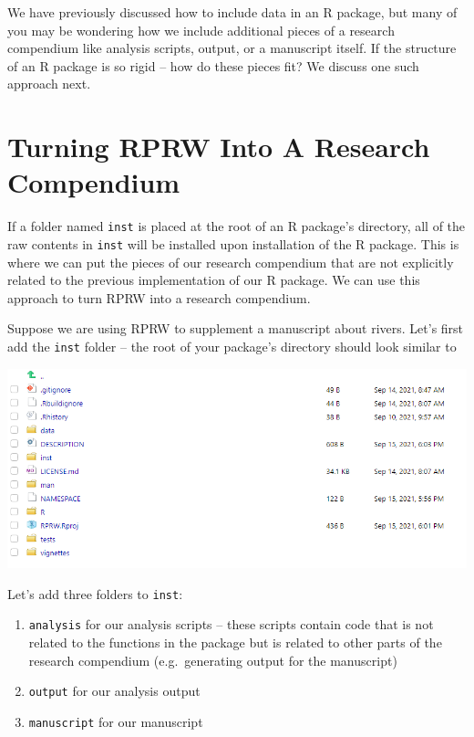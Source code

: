 \documentclass[
]{book}
\providecommand{\tightlist}{%
  \setlength{\itemsep}{0pt}\setlength{\parskip}{0pt}}
\begin{document}
We have previously discussed how to include data in an R package, but many of you may be wondering how we include additional pieces of a research compendium like analysis scripts, output, or a manuscript itself. If the structure of an R package is so rigid -- how do these pieces fit? We discuss one such approach next.

\hypertarget{rprw-to-rc}{%
\section{Turning RPRW Into A Research Compendium}\label{rprw-to-rc}}

If a folder named \texttt{inst} is placed at the root of an R package's directory, all of the raw contents in \texttt{inst} will be installed upon installation of the R package. This is where we can put the pieces of our research compendium that are not explicitly related to the previous implementation of our R package. We can use this approach to turn RPRW into a research compendium.

Suppose we are using RPRW to supplement a manuscript about rivers. Let's first add the \texttt{inst} folder -- the root of your package's directory should look similar to

\includegraphics[width=1\linewidth]{images/newrpack_files9}

Let's add three folders to \texttt{inst}:

\begin{enumerate}
\def\labelenumi{\arabic{enumi}.}
\tightlist
\item
  \texttt{analysis} for our analysis scripts -- these scripts contain code that is not related to the functions in the package but is related to other parts of the research compendium (e.g.~generating output for the manuscript)
\item
  \texttt{output} for our analysis output
\item
  \texttt{manuscript} for our manuscript
\end{enumerate}
\end{document}
